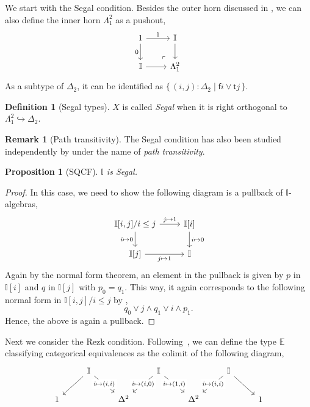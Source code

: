 \documentclass[a4paper,12pt]{amsart}
\newtheorem{proposition}[theorem]{Proposition}
\theoremstyle{definition}
\newtheorem{definition}[theorem]{Definition}
\newtheorem{remark}[theorem]{Remark}
\newcommand{\mbb}[1]{\mathbb{#1}}
\newcommand{\I}{\mbb I}
\newcommand{\ms}[1]{\mathsf{#1}}
\newcommand{\scomp}[2]{\{\,#1\mid#2\,\}}
\newcommand{\hook}{\hookrightarrow}
\begin{document}
We start with the Segal condition. Besides the outer horn discussed in , we can also define the inner horn $\Lambda^2_1$ as a pushout,
\[
  \begin{tikzcd}
    1 \ar[d, "0"'] \ar[r, "1"] & \I \ar[d] \\
    \I \ar[r] & \Lambda^2_1
    \arrow["\lrcorner"{anchor=center, pos=0.125, rotate=180}, draw=none, from=2-2, to=1-1]
  \end{tikzcd}
\]
As a subtype of $\Delta_2$, it can be identified as $\scomp{(i,j) : \Delta_2}{\ms fi \vee \ms tj}$.

\begin{definition}[Segal types]
  $X$ is called \emph{Segal} when it is right orthogonal to $\Lambda^2_1 \hook \Delta_2$.
\end{definition}

\begin{remark}[Path transitivity]
  The Segal condition has also been studied independently by \citet{fiore2001domains} under the name of \emph{path transitivity}.
\end{remark}

\begin{proposition}[SQCF]
  $\I$ is Segal.
\end{proposition}
\begin{proof}
  In this case, we need to show the following diagram is a pullback of $\I$-algebras, 
  \[
  \begin{tikzcd}
    \I[i,j]/i\le j \ar[r, "j \mapsto 1"] \ar[d, "i \mapsto 0"'] & \I[i] \ar[d, "i \mapsto 0"] \\
    \I[j] \ar[r, "j \mapsto 1"'] & \I
  \end{tikzcd}
  \]
  Again by the normal form theorem, an element in the pullback is given by $p$ in $\I[i]$ and $q$ in $\I[j]$ with $p_0 = q_1$. This way, it again corresponds to the following normal form in $\I[i,j]/i \le j$ by ,
  \[ q_0 \vee j \wedge q_1 \vee i \wedge p_1. \]
  Hence, the above is again a pullback.
\end{proof}

Next we consider the Rezk condition. Following~\cite{buchholtz2021synthetic}, we can define the type $\mbb E$ classifying categorical equivalences as the colimit of the following diagram,
\[
\begin{tikzcd}
	& \I && \I && \I \\
	1 && {\Delta^2} && {\Delta^2} && 1
	\arrow[from=1-2, to=2-1]
	\arrow["{i \mapsto (i,i)}"{description}, from=1-2, to=2-3]
	\arrow["{i \mapsto (i,0)}"{description}, from=1-4, to=2-3]
	\arrow["{i \mapsto (1,i)}"{description}, from=1-4, to=2-5]
	\arrow["{i \mapsto (i,i)}"{description}, from=1-6, to=2-5]
	\arrow[from=1-6, to=2-7]
\end{tikzcd}
\]
\end{document}
